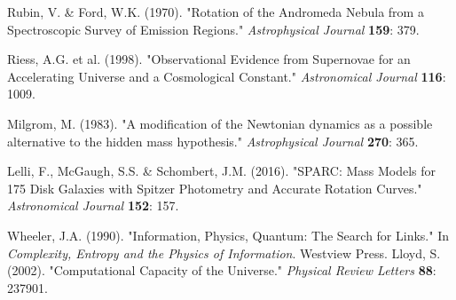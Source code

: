 \documentclass[twocolumn,prd,amsmath,amssymb,aps,superscriptaddress,nofootinbib]{revtex4-2}
\begin{document}
\begin{thebibliography}{99}
 Rubin, V. \& Ford, W.K. (1970). "Rotation of the Andromeda Nebula from a Spectroscopic Survey of Emission Regions." \textit{Astrophysical Journal} \textbf{159}: 379.

 Riess, A.G. et al. (1998). "Observational Evidence from Supernovae for an Accelerating Universe and a Cosmological Constant." \textit{Astronomical Journal} \textbf{116}: 1009.

 Milgrom, M. (1983). "A modification of the Newtonian dynamics as a possible alternative to the hidden mass hypothesis." \textit{Astrophysical Journal} \textbf{270}: 365.

 Lelli, F., McGaugh, S.S. \& Schombert, J.M. (2016). "SPARC: Mass Models for 175 Disk Galaxies with Spitzer Photometry and Accurate Rotation Curves." \textit{Astronomical Journal} \textbf{152}: 157.

 Wheeler, J.A. (1990). "Information, Physics, Quantum: The Search for Links." In \textit{Complexity, Entropy and the Physics of Information}. Westview Press.
 Lloyd, S. (2002). "Computational Capacity of the Universe." \textit{Physical Review Letters} \textbf{88}: 237901.
\end{thebibliography}
\end{document}
